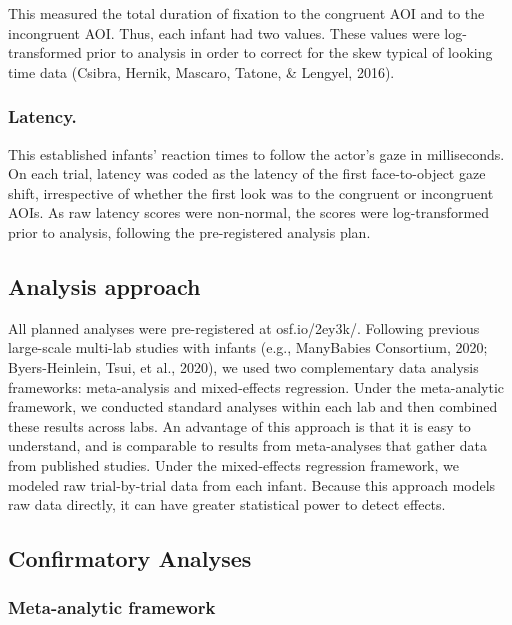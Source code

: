 \documentclass[,man,floatsintext]{apa6}
\begin{document}
This measured the total duration of fixation to the congruent AOI and to the incongruent AOI. Thus, each infant had two values. These values were log-transformed prior to analysis in order to correct for the skew typical of looking time data (Csibra, Hernik, Mascaro, Tatone, \& Lengyel, 2016).

\hypertarget{latency.}{%
\subsubsection{Latency.}\label{latency.}}

This established infants' reaction times to follow the actor's gaze in milliseconds. On each trial, latency was coded as the latency of the first face-to-object gaze shift, irrespective of whether the first look was to the congruent or incongruent AOIs. As raw latency scores were non-normal, the scores were log-transformed prior to analysis, following the pre-registered analysis plan.

\hypertarget{analysis-approach}{%
\subsection{Analysis approach}\label{analysis-approach}}

All planned analyses were pre-registered at osf.io/2ey3k/. Following previous large-scale multi-lab studies with infants (e.g., ManyBabies Consortium, 2020; Byers-Heinlein, Tsui, et al., 2020), we used two complementary data analysis frameworks: meta-analysis and mixed-effects regression. Under the meta-analytic framework, we conducted standard analyses within each lab and then combined these results across labs. An advantage of this approach is that it is easy to understand, and is comparable to results from meta-analyses that gather data from published studies. Under the mixed-effects regression framework, we modeled raw trial-by-trial data from each infant. Because this approach models raw data directly, it can have greater statistical power to detect effects.

\hypertarget{confirmatory-analyses}{%
\subsection{Confirmatory Analyses}\label{confirmatory-analyses}}

\hypertarget{meta-analytic-framework}{%
\subsubsection{Meta-analytic framework}\label{meta-analytic-framework}}
\end{document}
